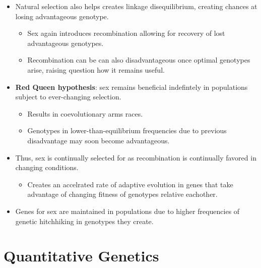 \documentclass[12pt,a4paper]{article}
\begin{document}
\begin{itemize}
\begin{itemize}
\begin{itemize}
                \item Natural selection also helps creates linkage disequilibrium, creating chances at losing advantageous genotype.
                    \begin{itemize}
                        \item Sex again introduces recombination allowing for recovery of lost advantageous genotypes.
                        \item Recombination can be can also disadvantageous once optimal genotypes arise, raising question how it remains useful.
                    \end{itemize}
                \item \textbf{Red Queen hypothesis}: sex remains beneficial indefintely in populations subject to ever-changing selection.
                    \begin{itemize}
                        \item Results in coevolutionary arms races.
                        \item Genotypes in lower-than-equilibrium frequencies due to previous disadvantage may soon become advantageous.
                    \end{itemize}
                \item Thus, sex is continually selected for as recombination is continually favored in changing conditions.
                    \begin{itemize}
                        \item Creates an accelrated rate of adaptive evolution in genes that take advantage of changing fitness of genotypes relative eachother.
                    \end{itemize}
                \item Genes for sex are maintained in populations due to higher frequencies of genetic hitchhiking in genotypes they create.
            \end{itemize}
    \end{itemize}
\end{itemize}

\clearpage
\section{Quantitative Genetics}
\end{document}
